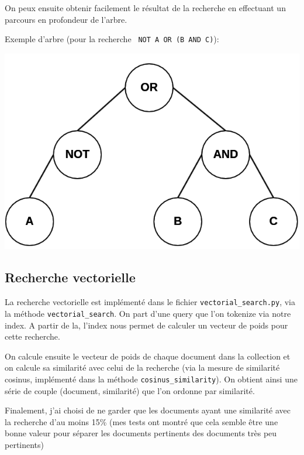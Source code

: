 \documentclass{article}
\begin{document}
On peux ensuite obtenir facilement le résultat de la recherche en effectuant un parcours en profondeur de l'arbre.

Exemple d'arbre (pour la recherche \texttt{ NOT A OR (B AND C)}):

\includegraphics[scale=0.5]{grap.png}

\subsection{Recherche vectorielle}
La recherche vectorielle est implémenté dans le fichier \texttt{vectorial\_search.py}, via la méthode \texttt{vectorial\_search}. On part d'une query que l'on tokenize via notre index. A partir de la, l'index nous permet de calculer un vecteur de poids pour cette recherche.

On calcule ensuite le vecteur de poids de chaque document dans la collection et on calcule sa similarité avec celui de la recherche (via la mesure de similarité cosinus, implémenté dans la méthode \texttt{cosinus\_similarity}). On obtient ainsi une série de couple (document, similarité) que l'on ordonne par similarité.

Finalement, j'ai choisi de ne garder que les documents ayant une similarité avec la recherche d'au moins 15\% (mes tests ont montré que cela semble être une bonne valeur pour séparer les documents pertinents des documents très peu pertinents)
\end{document}
